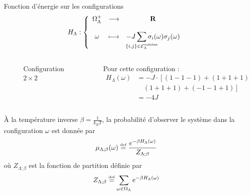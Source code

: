 \documentclass[french]{beamer}
\newcommand\eqdef{\overset{\mbox{\tiny def}}{=}}
\begin{document}
\begin{frame}
	\begin{definition}
		Fonction d'énergie sur les configurations
		\begin{align*}
		H_\Lambda :
		\left\{
		\begin{array}{ccc}
		\Omega_\Lambda^+ & \longrightarrow & \mathbf{R} \\
		\\
		\omega                   & \longmapsto       &  \displaystyle - J \sum_{\mathclap{\left\{i,j\right\} \in \mathcal{E}_\Lambda^\text{voisins}}} \sigma_i(\omega) \sigma_j(\omega)
		\end{array}
		\right.
		\end{align*}
	\end{definition}

\begin{columns}[onlytextwidth]
	\begin{column}{0.4\textwidth}
		\begin{figure}
			\centering
			\caption{Configuration $2\times2$}
			\label{fig:config22}
		\end{figure}
	\end{column}
	\begin{column}{0.6\textwidth}
		Pour cette configuration :
		\begin{align*}
			H_\Lambda(\omega) &=-J \cdot \left[(1 -1 -1) + (1 +1 +1) +\right. \\ 
							 &\left.\quad(1 + 1 + 1) + (-1 -1 + 1) \right] \\
							&= -4J
		\end{align*}
	\end{column}
\end{columns}
\end{frame}

\begin{frame}
    \begin{definition}
    \`A la température inverse $\beta = \frac{1}{k_BT}$, la probabilité d'observer le système dans la configuration \(\omega\)  est donnée par
        \[\mu_{\Lambda;\beta}(\omega) \eqdef \frac{e^ { - \beta H_\Lambda(\omega)}}{Z_{\Lambda;\beta}} \]
        où $Z_{\Lambda;\beta}$ est la fonction de partition définie par
        \[Z_{\Lambda;\beta} \eqdef  \sum_{\omega \in \Omega_\Lambda} e^{-\beta H_\Lambda(\omega)}\]
    \end{definition}
\end{frame}
\end{document}
